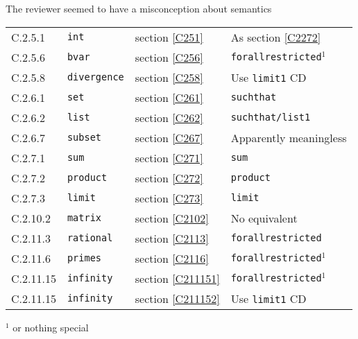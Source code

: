 \documentclass{llncs}
\begin{document}
\begin{newpart}{The reviewer seemed to have a misconception about semantics}
\begin{table}[h]
\begin{tabular}{llll}
C.2.5.1&{\tt int}&section \ref{C251}&As section \ref{C2272}\\
C.2.5.6&{\tt bvar}&section \ref{C256}&{\tt forallrestricted}${}^1$\\
C.2.5.8&{\tt divergence}&section \ref{C258}&Use {\tt limit1} CD\\
C.2.6.1&{\tt set}&section \ref{C261}&{\tt suchthat}\\
C.2.6.2&{\tt list}&section \ref{C262}&{\tt suchthat/list1}\\
C.2.6.7&{\tt subset}&section \ref{C267}&Apparently meaningless\\
C.2.7.1&{\tt sum}&section \ref{C271}&{\tt sum}\\
C.2.7.2&{\tt product}&section \ref{C272}&{\tt product}\\
C.2.7.3&{\tt limit}&section \ref{C273}&{\tt limit}\\
C.2.10.2&{\tt matrix}&section \ref{C2102}&No equivalent\\
C.2.11.3&{\tt rational}&section \ref{C2113}&{\tt forallrestricted}\\
C.2.11.6&{\tt primes}&section \ref{C2116}&{\tt forallrestricted}${}^1$\\
C.2.11.15&{\tt infinity}&section \ref{C211151}&{\tt forallrestricted}${}^1$\\
C.2.11.15&{\tt infinity}&section \ref{C211152}&Use {\tt limit1} CD\\
\end{tabular}
\begin{center}
${}^1$ or nothing special
\end{center}
\end{table}

\end{newpart}
\end{document}
